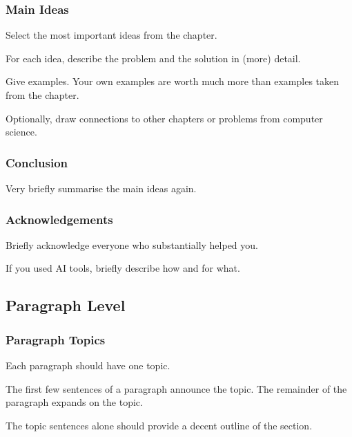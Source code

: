 \documentclass[xetex]{beamer}
\begin{document}
\begin{frame}
  \frametitle{Main Ideas}

  Select the most important ideas from the chapter.

  \medskip

  For each idea, describe the problem and the solution in (more) detail.

  \medskip

  Give examples. Your own examples are worth much more than examples taken from the chapter.

  \medskip

  Optionally, draw connections to other chapters or problems from computer science.
\end{frame}

\begin{frame}
  \frametitle{Conclusion}

  Very briefly summarise the main ideas again.
\end{frame}

\begin{frame}
  \frametitle{Acknowledgements}

  Briefly acknowledge everyone who substantially helped you.

  \medskip

  If you used AI tools, briefly describe how and for what.
\end{frame}

\subsection{Paragraph Level}

\begin{frame}
  \frametitle{Paragraph Topics}

  Each paragraph should have one topic.

  \medskip

  The first few sentences of a paragraph announce the topic.
  The remainder of the paragraph expands on the topic.

  \medskip

  The topic sentences alone should provide a decent outline of the section.
\end{frame}
\end{document}
